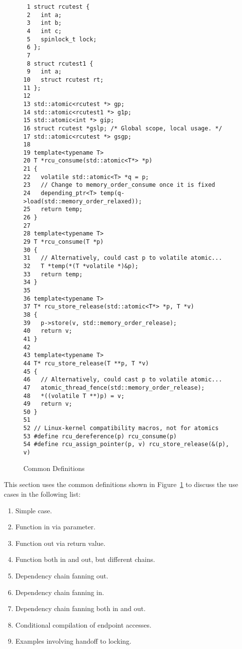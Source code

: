 \documentclass[letterpaper,10pt]{article}
\begin{document}
\begin{figure}[tbp]
{ \scriptsize
\begin{verbatim}
 1 struct rcutest {
 2   int a;
 3   int b;
 4   int c;
 5   spinlock_t lock;
 6 };
 7
 8 struct rcutest1 {
 9   int a;
10   struct rcutest rt;
11 };
12
13 std::atomic<rcutest *> gp;
14 std::atomic<rcutest1 *> g1p;
15 std::atomic<int *> gip;
16 struct rcutest *gslp; /* Global scope, local usage. */
17 std::atomic<rcutest *> gsgp;
18
19 template<typename T>
20 T *rcu_consume(std::atomic<T*> *p)
21 {
22   volatile std::atomic<T> *q = p;
23   // Change to memory_order_consume once it is fixed
24   depending_ptr<T> temp(q->load(std::memory_order_relaxed));
25   return temp;
26 }
27
28 template<typename T>
29 T *rcu_consume(T *p)
30 {
31   // Alternatively, could cast p to volatile atomic...
32   T *temp(*(T *volatile *)&p);
33   return temp;
34 }
35
36 template<typename T>
37 T* rcu_store_release(std::atomic<T*> *p, T *v)
38 {
39   p->store(v, std::memory_order_release);
40   return v;
41 }
42
43 template<typename T>
44 T* rcu_store_release(T **p, T *v)
45 {
46   // Alternatively, could cast p to volatile atomic...
47   atomic_thread_fence(std::memory_order_release);
48   *((volatile T **)p) = v;
49   return v;
50 }
51
52 // Linux-kernel compatibility macros, not for atomics
53 #define rcu_dereference(p) rcu_consume(p)
54 #define rcu_assign_pointer(p, v) rcu_store_release(&(p), v)
\end{verbatim}
}
\caption{Common Definitions}
\label{fig:Common Definitions}
\end{figure}

This section uses the common definitions shown in
Figure~\ref{fig:Common Definitions}
to discuss the use cases in the following list:

\begin{enumerate}
\item	Simple case.
\item	Function in via parameter.
\item	Function out via return value.
\item	Function both in and out, but different chains.
\item	Dependency chain fanning out.
\item	Dependency chain fanning in.
\item	Dependency chain fanning both in and out.
\item	Conditional compilation of endpoint accesses.
\item	Examples involving handoff to locking.
\end{enumerate}
\end{document}
